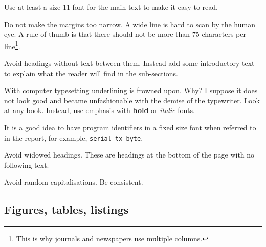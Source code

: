 \documentclass[a4paper,12pt]{article}
\newcommand{\code}[1]{\texttt{#1}}
\newcounter{foo}
\begin{document}
\begin{list}{P-}{}
\item Use at least a size 11 font for the main text to make it easy to read.

\item Do not make the margins too narrow.  A wide line is hard to scan
  by the human eye.  A rule of thumb is that there should not be more
  than 75 characters per line\footnote{This is why journals and
    newspapers use multiple columns.}.

\item Avoid headings without text between them.  Instead add some
  introductory text to explain what the reader will find in the
  sub-sections.

\item With computer typesetting underlining is frowned upon.  Why?  I
  suppose it does not look good and became unfashionable with the
  demise of the typewriter.  Look at any book.  Instead, use emphasis
  with \textbf{bold} or \textit{italic} fonts.

\item It is a good idea to have program identifiers in a fixed size
font when referred to in the report, for example,
\code{serial\_tx\_byte}.

\item Avoid widowed headings.  These are headings at the bottom of the
  page with no following text.

\item Avoid random capitalisations.  Be consistent.

\end{list}



\subsection{Figures, tables, listings}
\label{sec:figures}
\end{document}
